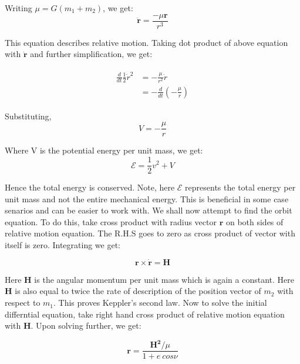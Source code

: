 \documentclass[12pt, letterpaper]{article}
\begin{document}
Writing $\mu = G(m_1+m_2)$, we get:
\begin{displaymath}
\mathbf{\ddot{r}}  = \frac{-\mu\mathbf{r}}{r^3}
\end{displaymath}

This equation describes relative motion. Taking dot product of above equation with $\mathbf{\dot{r}}$ and further simplification, we get:

\begin{gather*}
\begin{split}
\frac{d}{dt}\frac{1}{2}\dot{r}^2 & = - \frac{\mu}{r^2}\dot{r}\\
								& = - \frac{d}{dt}\left(-\frac{\mu}{r}\right)
\end{split}
\end{gather*}

Substituting,
\begin{displaymath}
V = -\frac{\mu}{r}
\end{displaymath}

Where V is the potential energy per unit mass, we get:
\begin{displaymath}
\mathcal{E} = \frac{1}{2}v^2 + V
\end{displaymath}

Hence the total energy is conserved. Note, here $\mathcal{E}$ represents the total energy per unit mass and not the entire mechanical energy. This is beneficial in some case senarios and can be easier to work with. We shall now attempt to find the orbit equation. To do this, take cross product with radius vector $\mathbf{r}$ on both sides of relative motion equation. The R.H.S goes to zero as cross product of vector with itself is zero. Integrating we get:

\begin{displaymath}
\mathbf{r}\times\mathbf{\dot{r}} = \mathbf{H}
\end{displaymath}

Here \textbf{H} is the angular momentum per unit mass which is again a constant. Here \textbf{H} is also equal to twice the rate of description of the position vector of $m_2$ with respect to $m_1$. This proves Keppler's second law. Now to solve the initial differntial equation, take right hand cross product of relative motion equation with \textbf{H}. Upon solving further, we get:

\begin{displaymath}
\mathbf{r} = \frac{\mathbf{H^2}/\mu}{1 + e\:cos\nu}
\end{displaymath}
\end{document}
